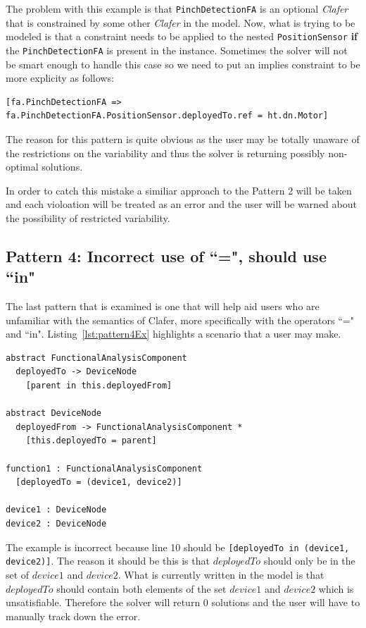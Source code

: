 \documentclass[10pt,oneside]{IEEEtran}
\begin{document}
The problem with this example is that \lstinline$PinchDetectionFA$ is an optional \textit{Clafer} that is constrained by some other \textit{Clafer} in the model. Now, what is trying to be modeled is that a constraint needs to be applied to the nested \lstinline$PositionSensor$ \textbf{if} the \lstinline$PinchDetectionFA$ is present in the instance. Sometimes the solver will not be smart enough to handle this case so we need to put an implies constraint to be more explicity as follows:
\begin{lstlisting}[]
[fa.PinchDetectionFA => fa.PinchDetectionFA.PositionSensor.deployedTo.ref = ht.dn.Motor]
\end{lstlisting}

The reason for this pattern is quite obvious as the user may be totally unaware of the restrictions on the variability and thus the solver is returning possibly non-optimal solutions.

In order to catch this mistake a similiar approach to the Pattern 2 will be taken and each violoation will be treated as an error and the user will be warned about the possibility of restricted variability.

\subsection{Pattern 4: Incorrect use of ``=", should use ``in"}
The last pattern that is examined is one that will help aid users who are unfamiliar with the semantics of Clafer, more specifically with the operators ``=" and ``in". Listing~\ref{lst:pattern4Ex} highlights a scenario that a user may make.
\begin{lstlisting}[label={lst:pattern4Ex},caption={Example of Pattern 4},numbers=right]
abstract FunctionalAnalysisComponent
  deployedTo -> DeviceNode
    [parent in this.deployedFrom]

abstract DeviceNode
  deployedFrom -> FunctionalAnalysisComponent *
    [this.deployedTo = parent]

function1 : FunctionalAnalysisComponent
  [deployedTo = (device1, device2)]

device1 : DeviceNode
device2 : DeviceNode
\end{lstlisting}

The example is incorrect because line 10 should be \lstinline$[deployedTo in (device1, device2)]$. The reason it should be this is that $deployedTo$ should only be in the set of $device1$ and $device2$. What is currently written in the model is that $deployedTo$ should contain both elements of the set $device1$ and $device2$ which is unsatisfiable. Therefore the solver will return 0 solutions and the user will have to manually track down the error.
\end{document}
